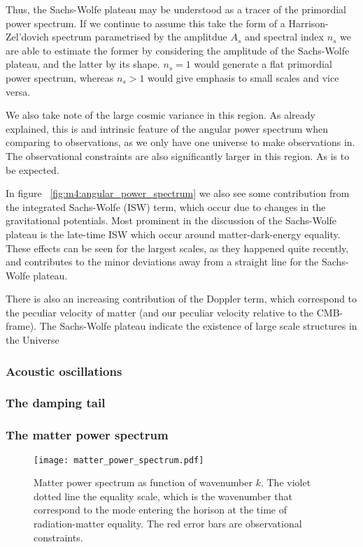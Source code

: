         Thus, the Sachs-Wolfe plateau may be understood as a tracer of the primordial power spectrum. If we continue to assume this take the form of a Harrison-Zel'dovich spectrum parametrised by the amplitdue $A_s$ and spectral index $n_s$ we are able to estimate the former by considering the amplitude of the Sachs-Wolfe plateau, and the latter by its shape. $n_s=1$ would generate a flat primordial power spectrum, whereas $n_s>1$ would give emphasis to small scales and vice versa. 

        We also take note of the large cosmic variance in this region. As already explained, this is and intrinsic feature of the angular power spectrum when comparing to observations, as we only have one universe to make observations in. The observational constraints are also significantly larger in this region. As is to be expected. 

        In figure ~\cref{fig:m4:angular_power_spectrum} we also see some contribution from the integrated Sachs-Wolfe (ISW) term, which occur due to changes in the gravitational potentials. Most prominent in the discussion of the Sachs-Wolfe plateau is the late-time ISW which occur around matter-dark-energy equality. These effects can be seen for the largest scales, as they happened quite recently, and contributes to the minor deviations away from a straight line for the Sachs-Wolfe plateau.
        
        There is also an increasing contribution of the Doppler term, which correspond to the peculiar velocity of matter (and our peculiar velocity relative to the CMB-frame). The Sachs-Wolfe plateau indicate the existence of large scale structures in the Universe 

    \subsubsection{Acoustic oscillations}

    \subsubsection{The damping tail}


    \subsubsection{The matter power spectrum}
    
    \begin{figure}
        \texttt{[image: matter\_power\_spectrum.pdf]}
        \caption{Matter power spectrum as function of wavenumber $k$. The violet dotted line the equality scale, which is the wavenumber that correspond to the mode entering the horison at the time of radiation-matter equality. The red error bars are observational constraints.}
        \label{fig:m4:matter_power_spectrum}
    \end{figure}